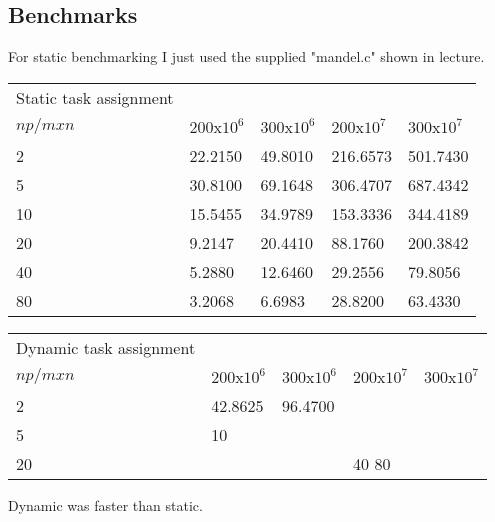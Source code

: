 \documentclass{article}
\begin{document}
\subsection*{Benchmarks}

For static benchmarking I just used the supplied "mandel.c" shown in lecture.

\begin{table}[h]
\begin{tabular}{lllll}
Static task assignment & & & & \\
$np/mxn$ & 200x$10^{6}$ & 300x$10^{6}$ & 200x$10^{7}$ & 300x$10^{7}$\\
2 & 22.2150 & 49.8010 & 216.6573 & 501.7430\\
5 & 30.8100 & 69.1648 & 306.4707 & 687.4342\\
10 & 15.5455 & 34.9789 & 153.3336  & 344.4189\\
20 & 9.2147 & 20.4410 & 88.1760 & 200.3842\\
40 & 5.2880 & 12.6460 & 29.2556  & 79.8056\\
80 & 3.2068 & 6.6983 & 28.8200 & 63.4330
\end{tabular}
\end{table}

\begin{table}[h]
\begin{tabular}{lllll}
Dynamic task assignment & & & &\\
$np/mxn$ & 200x$10^{6}$ & 300x$10^{6}$ & 200x$10^{7}$ & 300x$10^{7}$\\
2 & 42.8625 & 96.4700 & & \\
5 & 
10 &  &  &\\
20 &  &  &
40
80
\end{tabular}
\end{table}

Dynamic was faster than static.
\end{document}
